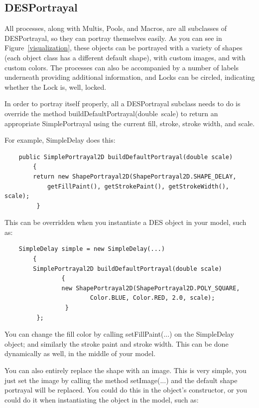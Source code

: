 \documentclass[twoside,10pt]{article}
\newcommand\method[1]{\hbox{\textsf{#1}}}
\begin{document}
\subsection{DESPortrayal}

All processes, along with Multis, Pools, and Macros, are all subclasses of DESPortrayal, so they can portray themselves easily.  As you can see in Figure~\ref{visualization}, these objects can be portrayed with a variety of shapes (each object class has a different default shape), with custom images, and with custom colors.  The processes can also be accompanied by a number of labels underneath providing additional information, and Locks can be circled, indicating whether the Lock is, well, locked.

In order to portray itself properly, all a DESPortrayal subclass needs to do is override the method \method{buildDefaultPortrayal(double scale)} to return an appropriate SimplePortrayal using the current fill, stroke, stroke width, and scale.  

For example, SimpleDelay does this:

\begin{verbatim}
    public SimplePortrayal2D buildDefaultPortrayal(double scale)
        {
        return new ShapePortrayal2D(ShapePortrayal2D.SHAPE_DELAY, 
            getFillPaint(), getStrokePaint(), getStrokeWidth(), scale);
         }
\end{verbatim}

This can be overridden when you instantiate a DES object in your model, such as:

\begin{verbatim}
    SimpleDelay simple = new SimpleDelay(...)
        {
        SimplePortrayal2D buildDefaultPortrayal(double scale)
                {
                new ShapePortrayal2D(ShapePortrayal2D.POLY_SQUARE,
                        Color.BLUE, Color.RED, 2.0, scale);
                 }
         };
\end{verbatim}

You can change the fill color by calling \method{setFillPaint(...)} on the SimpleDelay object; and similarly the stroke paint and stroke width.  This can be done dynamically as well, in the middle of your model.

You can also entirely replace the shape with an image.  This is very simple, you just set the image by calling the method \method{setImage(...)} and the default shape portrayal will be replaced.  You could do this in the object's constructor, or you could do it when instantiating the object in the model, such as:
\end{document}
